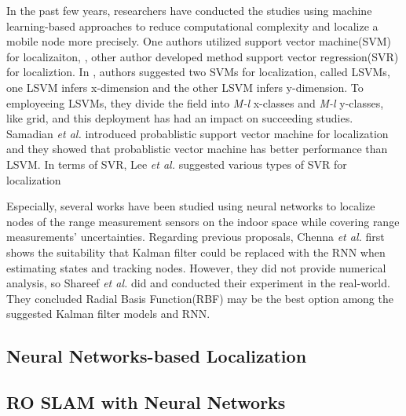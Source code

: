 \documentclass[letterpaper, 10 pt, conference]{ieeeconf}  %
\begin{document}
In the past few years, researchers have conducted the studies using machine learning-based approaches to reduce computational complexity and localize a mobile node more precisely. One authors utilized support vector machine(SVM) for localizaiton, \cite{tran2008localization, huan2010three, feng2012determination, afzal2014localization}, other author developed method support vector regression(SVR) for localiztion\cite{lee2013new, lee2013novel}. In \cite{tran2008localization}, authors suggested two SVMs for localization, called LSVMs, one LSVM infers x-dimension and the other LSVM infers y-dimension. To employeeing LSVMs, they divide the field into \textit{M-l} x-classes and \textit{M-l} y-classes, like grid, and this deployment has had an impact on succeeding studies\cite{chatterjee2010fletcher, feng2012determination, afzal2014localization}. Samadian \textit{et al.}\cite{samadian2011probabilistic} introduced probablistic support vector machine for localization and they showed that probablistic vector machine has better performance than LSVM. In terms of SVR, Lee \textit{et al.} suggested various types of SVR for localization\cite{lee2013new, lee2013novel}  

Especially, several works have been studied using neural networks to localize nodes of the range measurement sensors on the indoor space while covering range measurements' uncertainties. Regarding previous proposals, Chenna \textit{et al.} first shows the suitability that Kalman filter could be replaced with the RNN when estimating states and tracking nodes\cite{chenna2004state}. However, they did not provide numerical analysis, so Shareef \textit{et al.} did and conducted their experiment in the real-world. They concluded Radial Basis Function(RBF) may be the best option among the suggested Kalman filter models and RNN\cite{shareef2008localization}. 

\subsection{Neural Networks-based Localization}


\subsection{RO SLAM with Neural Networks}
\end{document}
